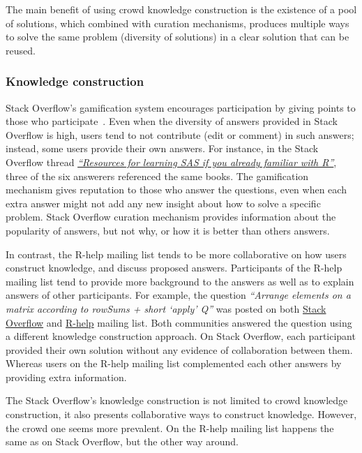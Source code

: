     The main benefit of using crowd knowledge construction is the existence of a pool of solutions, which combined with curation mechanisms, produces multiple ways to solve the same problem (diversity of solutions) in a clear solution that can be reused.

\subsubsection{Knowledge construction}

    Stack Overflow's gamification system encourages participation by giving points to those who participate~\cite{Singer2013}.
    Even when the diversity of answers provided in Stack Overflow is high, users tend to not contribute (edit or comment) in such answers; instead, some users provide their own answers.
    For instance, in the Stack Overflow thread \textit{\href{http://goo.gl/Mb4Pbk}{``Resources for learning SAS if you already familiar with R''}}, three of the six answerers referenced the same books.
    The gamification mechanism gives reputation to those who answer the questions, even when each extra answer might not add any new insight about how to solve a specific problem.
    Stack Overflow curation mechanism provides information about the popularity of answers, but not why, or how it is better than others answers.

    In contrast, the R-help mailing list tends to be more collaborative on how users construct knowledge, and discuss proposed answers.
    Participants of the R-help mailing list tend to provide more background to the answers as well as to explain answers of other participants.
    For example, the question \textit{``Arrange elements on a matrix according to rowSums + short `apply' Q''} was posted on both \href{http://goo.gl/a8AES8}{Stack Overflow} and \href{http://goo.gl/PGflT5}{R-help} mailing list.
    Both communities answered the question using a different knowledge construction approach.
    On Stack Overflow, each participant provided their own solution without any evidence of collaboration between them.
    Whereas users on the R-help mailing list complemented each other answers by providing extra information.

    The Stack Overflow's knowledge construction is not limited to crowd knowledge construction, it also presents collaborative ways to construct knowledge.
    However, the crowd one seems more prevalent.
    On the R-help mailing list happens the same as on Stack Overflow, but the other way around.

